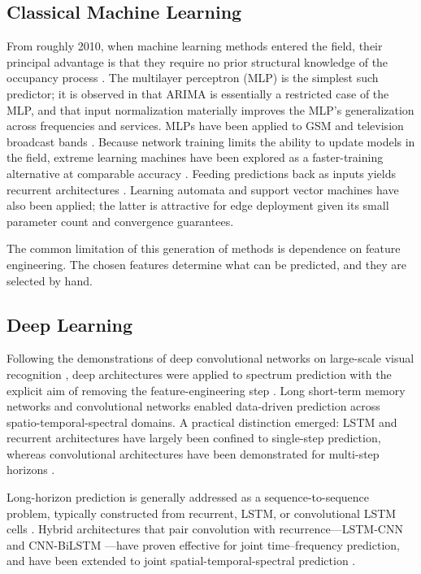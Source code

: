 \documentclass[lettersize,journal]{IEEEtran}
\begin{document}
\subsection{\textbf{Classical Machine Learning}}
From roughly 2010, when machine learning methods entered the field, their
principal advantage is that they require no prior structural
knowledge of the occupancy process \cite{Tumuluru2010}.
The multilayer perceptron (MLP) is the simplest such predictor; it is
observed in \cite{Yin2011} that ARIMA is essentially a restricted case
of the MLP, and that input normalization materially improves the MLP's
generalization across frequencies and services.
MLPs have been applied to GSM \cite{Yin2011} and television broadcast bands
\cite{Winston2013}. Because network training limits the ability to update
models in the field, extreme learning machines have been explored as a
faster-training alternative at comparable accuracy \cite{Yang2014}.
Feeding predictions back as inputs yields recurrent architectures
\cite{Taj2011,Yang2013}. Learning automata \cite{Golestanian2014} and support
vector machines \cite{Ni2011} have also been applied; the latter is attractive
for edge deployment given its small parameter count and convergence guarantees.

The common limitation of this generation of methods is dependence on feature
engineering. The chosen features determine what can be predicted, and they are
selected by hand.

\subsection{\textbf{Deep Learning}}
Following the demonstrations of deep convolutional networks on
large-scale visual recognition \cite{Krizhevsky2012}, deep architectures
were applied to spectrum prediction with the explicit aim of removing
the feature-engineering step \cite{Wang2024}.
Long short-term memory networks \cite{Wang2017,Ozyegen2020} and convolutional
networks \cite{Jia2020} enabled data-driven prediction across
spatio-temporal-spectral domains.
A practical distinction emerged: LSTM and recurrent architectures have
largely been confined to single-step prediction, whereas convolutional
architectures have been demonstrated for multi-step horizons \cite{Yu2018}.

Long-horizon prediction is generally addressed as a sequence-to-sequence
problem, typically constructed from recurrent, LSTM, or convolutional
LSTM cells \cite{Wang2024}.
Hybrid architectures that pair convolution with recurrence---LSTM-CNN
\cite{Zhang2021} and CNN-BiLSTM \cite{Ding2020}---have proven effective for
joint time--frequency prediction, and have been extended to joint
spatial-temporal-spectral prediction \cite{Shawel2019, Wen2023}.
\end{document}
